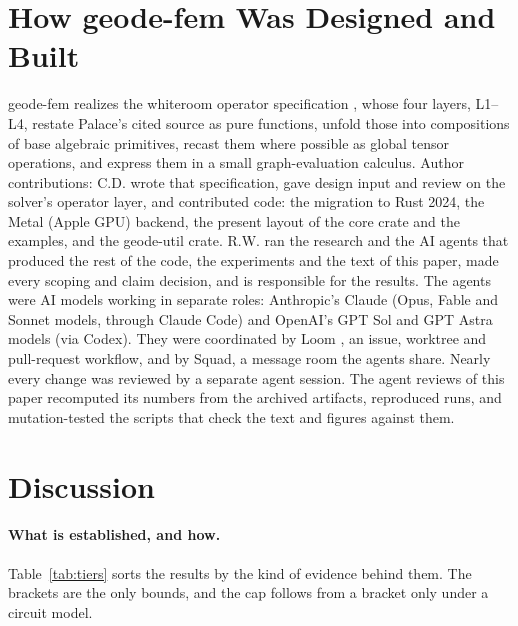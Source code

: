 \documentclass{anvil-paper}
\begin{document}
\section{How geode-fem Was Designed and Built}
\label{sec:built}

geode-fem realizes the whiteroom operator specification
\citep{dunnavant2026whiteroom}, whose four layers, L1--L4,
restate Palace's cited source as pure functions, unfold those into
compositions of base algebraic primitives, recast them where possible as
global tensor operations, and express them in a small graph-evaluation
calculus. Author contributions: C.D. wrote that specification, gave design input and review on the solver's operator layer, and contributed code: the
migration to Rust 2024, the Metal (Apple GPU) backend, the present layout
of the core crate and the examples, and the geode-util crate. R.W. ran
the research and the AI agents that produced the rest of the code, the
experiments and the text of this paper, made every scoping and claim
decision, and is responsible for the results. The agents were AI models
working in separate roles: Anthropic's Claude (Opus, Fable and Sonnet
models, through Claude Code) and OpenAI's GPT Sol and GPT Astra models
(via Codex). They were coordinated by Loom \citep{loom}, an
issue, worktree and pull-request workflow, and by Squad, a message room
the agents share.
Nearly every change was reviewed by a separate agent session. The agent
reviews of this paper recomputed its numbers from the archived artifacts,
reproduced runs, and mutation-tested the scripts that check the text and
figures against them.

\section{Discussion}
\label{sec:discussion}

\paragraph{What is established, and how.}
Table~\ref{tab:tiers} sorts the results by the kind of evidence behind
them. The brackets are the only bounds, and the cap follows from a bracket
only under a circuit model.
\end{document}
